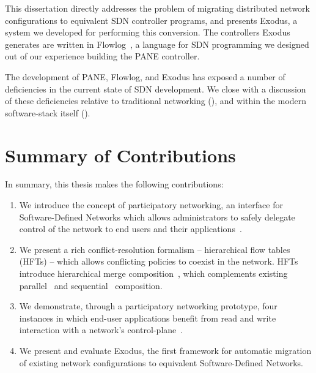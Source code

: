 %
This dissertation directly addresses the problem of migrating distributed network
configurations to equivalent SDN controller programs, and presents Exodus, a
system we developed for performing this conversion.
The controllers Exodus generates are written in Flowlog~\cite{Nelson:2014flowlog},
a language for SDN programming we designed out of our experience building
the PANE controller.

The development of PANE, Flowlog, and Exodus has exposed a number of
deficiencies in the current state of SDN development.
We close with a discussion of these deficiencies relative to traditional networking
(), and within the modern software-stack itself ().


\section{Summary of Contributions}

In summary, this thesis makes the following contributions:

\begin{enumerate}

\item We introduce the concept of participatory networking, an interface for
Software-Defined Networks which allows administrators to safely delegate
control of the network to end users and their applications~\cite{Ferguson:2012a}.

\item We present a rich conflict-resolution formalism -- hierarchical flow tables (HFTs) --
which allows conflicting policies to coexist in the network. HFTs introduce hierarchical
merge composition~\cite{Ferguson:2012b}, which complements existing
parallel~\cite{Foster:2010} and sequential~\cite{monsanto++:nsdi13-pyretic} composition.

\item We demonstrate, through a participatory networking prototype, four
instances in which end-user applications benefit from read and write interaction
with a network's control-plane~\cite{Ferguson:2013sigcomm}.

\item We present and evaluate Exodus, the first framework for automatic migration of
existing network configurations to equivalent Software-Defined Networks.

\end{enumerate}



